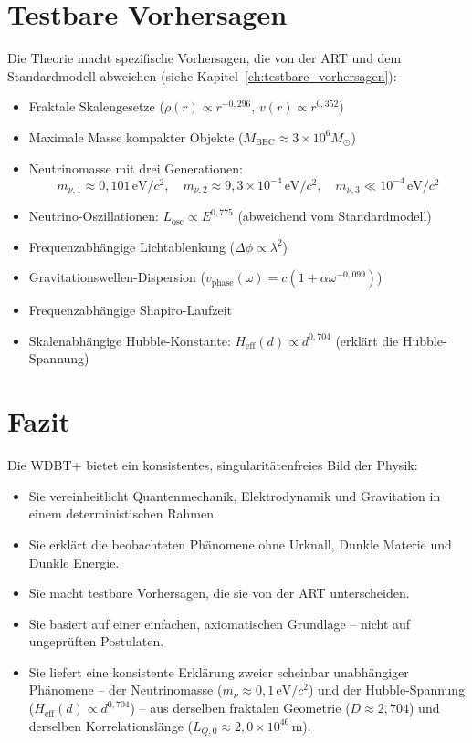 \section{Testbare Vorhersagen}
\label{sec:vorhersagen_zf}

Die Theorie macht spezifische Vorhersagen, die von der ART und dem Standardmodell abweichen (siehe Kapitel~\ref{ch:testbare_vorhersagen}):

\begin{itemize}
    \item Fraktale Skalengesetze (\( \rho(r) \propto r^{-0,296} \), \( v(r) \propto r^{0,352} \))
    \item Maximale Masse kompakter Objekte (\( M_{\text{BEC}} \approx 3 \times 10^6 M_\odot \))
    \item Neutrinomasse mit drei Generationen:
    \[
    m_{\nu,1} \approx 0{,}101 \, \text{eV}/c^2, \quad
    m_{\nu,2} \approx 9{,}3 \times 10^{-4} \, \text{eV}/c^2, \quad
    m_{\nu,3} \ll 10^{-4} \, \text{eV}/c^2
    \]
    \item Neutrino-Oszillationen: \( L_{\text{osc}} \propto E^{0,775} \) (abweichend vom Standardmodell)
    \item Frequenzabhängige Lichtablenkung (\( \Delta\phi \propto \lambda^2 \))
    \item Gravitationswellen-Dispersion (\( v_{\text{phase}}(\omega) = c(1 + \alpha\omega^{-0,099}) \))
    \item Frequenzabhängige Shapiro-Laufzeit
    \item Skalenabhängige Hubble-Konstante: \( H_{\text{eff}}(d) \propto d^{0,704} \) (erklärt die Hubble-Spannung)
\end{itemize}

\section{Fazit}
\label{sec:fazit_zf}

Die WDBT+ bietet ein konsistentes, singularitätenfreies Bild der Physik:

\begin{itemize}
    \item Sie vereinheitlicht Quantenmechanik, Elektrodynamik und Gravitation in einem deterministischen Rahmen.
    \item Sie erklärt die beobachteten Phänomene ohne Urknall, Dunkle Materie und Dunkle Energie.
    \item Sie macht testbare Vorhersagen, die sie von der ART unterscheiden.
    \item Sie basiert auf einer einfachen, axiomatischen Grundlage – nicht auf ungeprüften Postulaten.
    \item Sie liefert eine konsistente Erklärung zweier scheinbar unabhängiger Phänomene – der Neutrinomasse (\( m_\nu \approx 0{,}1 \, \text{eV}/c^2 \)) und der Hubble-Spannung (\( H_{\text{eff}}(d) \propto d^{0,704} \)) – aus derselben fraktalen Geometrie (\( D \approx 2,704 \)) und derselben Korrelationslänge (\( L_{Q,0} \approx 2{,}0 \times 10^{46} \, \text{m} \)).
\end{itemize}

